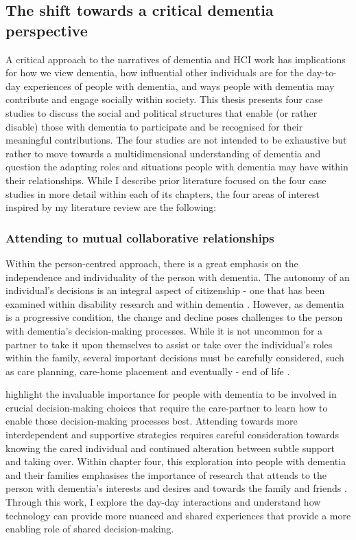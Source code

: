 \subsection{The shift towards a critical dementia perspective}
\label{BL:shift}
A critical approach to the narratives of dementia and HCI work has implications for how we view dementia, how influential other individuals are for the day-to-day experiences of people with dementia, and ways people with dementia may contribute and engage socially within society. This thesis presents four case studies to discuss the social and political structures that enable (or rather disable) those with dementia to participate and be recognised for their meaningful contributions. The four studies are not intended to be exhaustive but rather to move towards a multidimensional understanding of dementia and question the adapting roles and situations people with dementia may have within their relationships. While I describe prior literature focused on the four case studies in more detail within each of its chapters, the four areas of interest inspired by my literature review are the following:

\subsubsection{Attending to mutual collaborative relationships}
\label{BL:chapter4Overview}
Within the person-centred approach, there is a great emphasis on the independence and individuality of the person with dementia. The autonomy of an individual's decisions is an integral aspect of citizenship - one that has been examined within disability research and within dementia \citep{meissner_-it-yourself_2017, samsi_everyday_2013}. However, as dementia is a progressive condition, the change and decline poses challenges to the person with dementia's decision-making processes. While it is not uncommon for a partner to take it upon themselves to assist or take over the individual's roles within the family, several important decisions must be carefully considered, such as care planning, care-home placement and eventually - end of life \citep{fetherstonhaugh_decision-making_2017}. 

\cite{fetherstonhaugh2013being} highlight the invaluable importance for people with dementia to be involved in crucial decision-making choices that require the care-partner to learn how to enable those decision-making processes best. Attending towards more interdependent and supportive strategies requires careful consideration towards knowing the cared individual and continued alteration between subtle support and taking over. Within chapter four, this exploration into people with dementia and their families emphasises the importance of research that attends to the person with dementia's interests and desires and towards the family and friends \citep{keyes2019living}. Through this work, I  explore the day-day interactions and understand how technology can provide more nuanced and shared experiences that provide a more enabling role of shared decision-making. 

